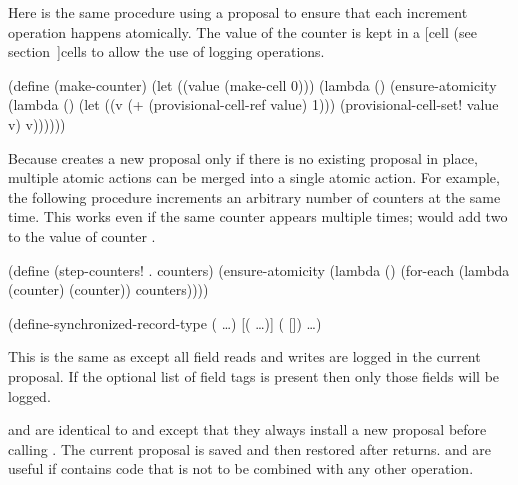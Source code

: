 Here is the same procedure using a proposal to ensure that each
 increment operation happens atomically.
The value of the counter is kept in a
 [cell (see section~\Ref]{cells}
 to allow the use of
 logging operations.
\begin{example}
(define (make-counter)
  (let ((value (make-cell 0)))
    (lambda ()
      (ensure-atomicity
        (lambda ()
          (let ((v (+ (provisional-cell-ref value)
                      1)))
            (provisional-cell-set! value v)
            v))))))
\end{example}

Because  creates a new proposal only if there is
 no existing proposal in place, multiple atomic actions can be merged
 into a single atomic action.
For example, the following procedure increments an arbitrary number of
 counters at the same time.
This works even if the same counter appears multiple times;
  would add two to the value of counter .
\begin{example}
(define (step-counters! . counters)
  (ensure-atomicity
    (lambda ()
      (for-each (lambda (counter)
                  (counter))
                counters))))
\end{example}

\begin{example}
(define-synchronized-record-type  
  (  \ldots)
  [(\cvar {} \ldots)]
  (  [])
  \ldots)
\end{example}
This is the same as 
 except all field reads and
 writes are logged in the current proposal.
If the optional list of field tags is present then only those fields will
 be logged.

\begin{protos}
\end{protos}
\noindent
{} and  are identical
 to  and  except that they
 always install a new proposal before calling .
The current proposal is saved and then restored after  returns.
 and  are useful if  contains
 code that is not to be combined with any other operation.

